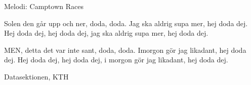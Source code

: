 \begin{song}

\begin{songmeta}
Melodi: Camptown Races
\end{songmeta}

\begin{songtext}
Solen den går upp och ner, doda, doda.
Jag ska aldrig supa mer, hej doda dej.
Hej doda dej, hej doda dej,
jag ska aldrig supa mer, hej doda dej.

MEN, detta det var inte sant, doda, doda.
Imorgon gör jag likadant, hej doda dej.
Hej doda dej, hej doda dej,
i morgon gör jag likadant, hej doda dej.
\end{songtext}

\begin{songnotes}
Datasektionen, KTH
\end{songnotes}

\end{song}
